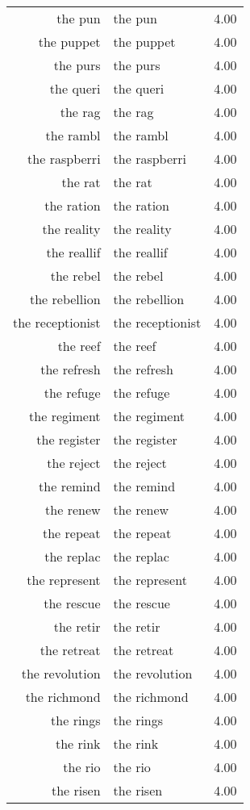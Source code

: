 \begin{table}[ht]
\begin{tabular}{rlr}
  the pun & the pun & 4.00 \\ 
  the puppet & the puppet & 4.00 \\ 
  the purs & the purs & 4.00 \\ 
  the queri & the queri & 4.00 \\ 
  the rag & the rag & 4.00 \\ 
  the rambl & the rambl & 4.00 \\ 
  the raspberri & the raspberri & 4.00 \\ 
  the rat & the rat & 4.00 \\ 
  the ration & the ration & 4.00 \\ 
  the reality & the reality & 4.00 \\ 
  the reallif & the reallif & 4.00 \\ 
  the rebel & the rebel & 4.00 \\ 
  the rebellion & the rebellion & 4.00 \\ 
  the receptionist & the receptionist & 4.00 \\ 
  the reef & the reef & 4.00 \\ 
  the refresh & the refresh & 4.00 \\ 
  the refuge & the refuge & 4.00 \\ 
  the regiment & the regiment & 4.00 \\ 
  the register & the register & 4.00 \\ 
  the reject & the reject & 4.00 \\ 
  the remind & the remind & 4.00 \\ 
  the renew & the renew & 4.00 \\ 
  the repeat & the repeat & 4.00 \\ 
  the replac & the replac & 4.00 \\ 
  the represent & the represent & 4.00 \\ 
  the rescue & the rescue & 4.00 \\ 
  the retir & the retir & 4.00 \\ 
  the retreat & the retreat & 4.00 \\ 
  the revolution & the revolution & 4.00 \\ 
  the richmond & the richmond & 4.00 \\ 
  the rings & the rings & 4.00 \\ 
  the rink & the rink & 4.00 \\ 
  the rio & the rio & 4.00 \\ 
  the risen & the risen & 4.00 \\ 

\end{tabular}
\end{table}

